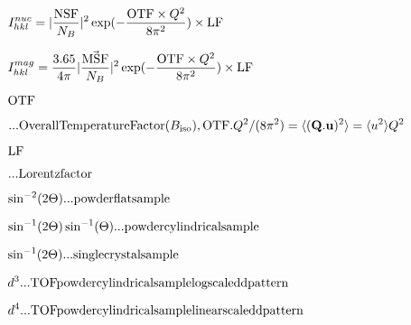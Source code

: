 \documentclass[twoside]{article}
\def\lthtmlcheckvsize{\ifdim\ht\sizebox<\vsize 
  \ifdim\wd\sizebox<\hsize\expandafter\hfill\fi \expandafter\vfill
  \else\expandafter\vss\fi}%
\begin{document}
{\newpage\clearpage
{}%
$\displaystyle I^{nuc}_{hkl}=|\frac{\rm NSF}{N_B}|^2 \exp(-\frac{{\rm OTF}\times Q^2}{8\pi^2}) \times {\rm LF} 
$%
\lthtmlindisplaymathZ
\lthtmlcheckvsize\clearpage}

{\newpage\clearpage
{}%
$\displaystyle I^{mag}_{hkl}=\frac{3.65}{4\pi}|\frac{\vec{\rm MSF}}{N_B}|^2  \exp(-\frac{{\rm OTF}\times Q^2}{8\pi^2}) \times {\rm %
LF} 
$%
\lthtmlindisplaymathZ
\lthtmlcheckvsize\clearpage}

{\newpage\clearpage
{}%
$\displaystyle {\rm OTF}$%
\lthtmlindisplaymathZ
\lthtmlcheckvsize\clearpage}

{\newpage\clearpage
{}%
$\displaystyle {\rm ... Overall Temperature Factor (}B_{\rm iso}),{\rm OTF}.Q^2/(8\pi^2) =\langle (\mathbf Q.\mathbf %
u)^2 \rangle = \langle u^2 \rangle Q^2$%
\lthtmlindisplaymathZ
\lthtmlcheckvsize\clearpage}

{\newpage\clearpage
{}%
$\displaystyle {\rm LF}$%
\lthtmlindisplaymathZ
\lthtmlcheckvsize\clearpage}

{\newpage\clearpage
{}%
$\displaystyle {\rm ... Lorentzfactor}$%
\lthtmlindisplaymathZ
\lthtmlcheckvsize\clearpage}

{\newpage\clearpage
{}%
$\displaystyle \sin^{-2}(2\Theta){\rm ... powder flat sample}$%
\lthtmlindisplaymathZ
\lthtmlcheckvsize\clearpage}

{\newpage\clearpage
{}%
$\displaystyle \sin^{-1}(2\Theta)\sin^{-1}(\Theta){\rm ... powder cylindrical sample}$%
\lthtmlindisplaymathZ
\lthtmlcheckvsize\clearpage}

{\newpage\clearpage
{}%
$\displaystyle \sin^{-1}(2\Theta){\rm ...single crystal sample}$%
\lthtmlindisplaymathZ
\lthtmlcheckvsize\clearpage}

{\newpage\clearpage
{}%
$\displaystyle d^3 {\rm ... TOF powder cylindrical sample log scaled d pattern}$%
\lthtmlindisplaymathZ
\lthtmlcheckvsize\clearpage}

{\newpage\clearpage
{}%
$\displaystyle d^4 {\rm ... TOF powder cylindrical sample linear scaled d pattern}$%
\lthtmlindisplaymathZ
\lthtmlcheckvsize\clearpage}
\end{document}
